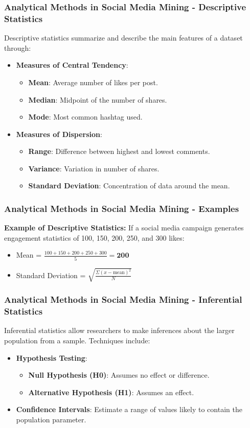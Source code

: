 \documentclass{beamer}
\begin{document}
\begin{frame}[fragile]
    \frametitle{Analytical Methods in Social Media Mining - Descriptive Statistics}
    Descriptive statistics summarize and describe the main features of a dataset through:
    \begin{itemize}
        \item \textbf{Measures of Central Tendency}:
        \begin{itemize}
            \item \textbf{Mean}: Average number of likes per post.
            \item \textbf{Median}: Midpoint of the number of shares.
            \item \textbf{Mode}: Most common hashtag used.
        \end{itemize}
        \item \textbf{Measures of Dispersion}:
        \begin{itemize}
            \item \textbf{Range}: Difference between highest and lowest comments.
            \item \textbf{Variance}: Variation in number of shares.
            \item \textbf{Standard Deviation}: Concentration of data around the mean.
        \end{itemize}
    \end{itemize}
\end{frame}

\begin{frame}[fragile]
    \frametitle{Analytical Methods in Social Media Mining - Examples}
    \textbf{Example of Descriptive Statistics:}
    If a social media campaign generates engagement statistics of 100, 150, 200, 250, and 300 likes:
    \begin{itemize}
        \item Mean = \( \frac{100 + 150 + 200 + 250 + 300}{5} = \textbf{200} \)
        \item Standard Deviation = \( \sqrt{\frac{\Sigma(x - \text{mean})^2}{N}} \)
    \end{itemize}
\end{frame}

\begin{frame}[fragile]
    \frametitle{Analytical Methods in Social Media Mining - Inferential Statistics}
    Inferential statistics allow researchers to make inferences about the larger population from a sample. Techniques include:
    \begin{itemize}
        \item \textbf{Hypothesis Testing}:
        \begin{itemize}
            \item \textbf{Null Hypothesis (H0)}: Assumes no effect or difference.
            \item \textbf{Alternative Hypothesis (H1)}: Assumes an effect.
        \end{itemize}
        \item \textbf{Confidence Intervals}: Estimate a range of values likely to contain the population parameter.
    \end{itemize}
\end{frame}
\end{document}
